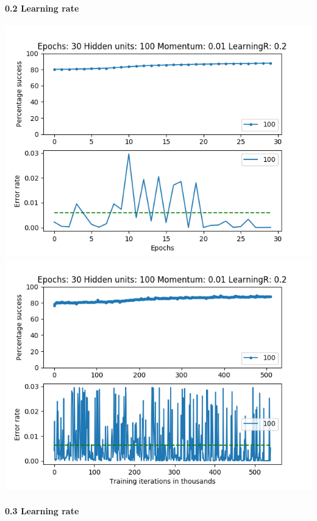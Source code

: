 \documentclass[11pt]{article}
\makeatletter
\def\maxwidth{\ifdim\Gin@nat@width>\linewidth\linewidth
    \else\Gin@nat@width\fi}
\let\Oldincludegraphics\includegraphics
\renewcommand{\includegraphics}[1]{\Oldincludegraphics[width=.8\maxwidth]{#1}}
\makeatother
\begin{document}
\hypertarget{learning-rate-2}{%
\paragraph{0.2 Learning rate}\label{learning-rate-2}}

\includegraphics{Experiment2/E2_NN_Epoch_Momentum_0.01_30Epochs_100_LR_0.2_Hiddenunits.png}
\includegraphics{Experiment2/E2_NN_Training_Momentum_0.01_30Epochs_100_LR_0.2_Hiddenunits.png}

\hypertarget{learning-rate-3}{%
\paragraph{0.3 Learning rate}\label{learning-rate-3}}
\end{document}
